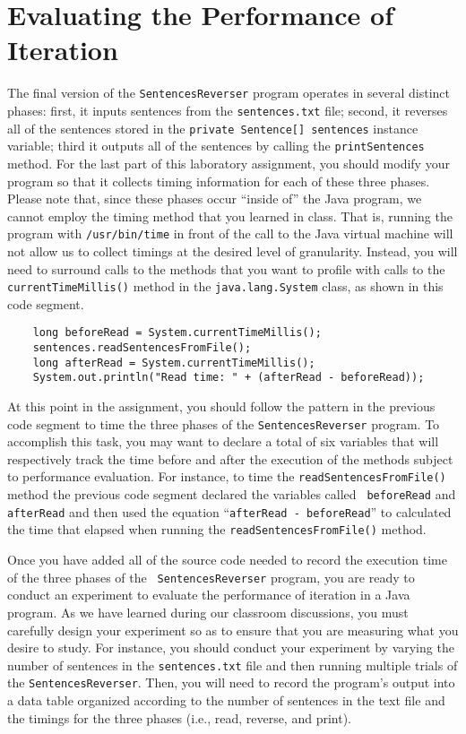 \section*{Evaluating the Performance of Iteration}

The final version of the {\tt SentencesReverser} program operates in several distinct phases: first, it inputs sentences
from the {\tt sentences.txt} file; second, it reverses all of the sentences stored in the {\tt private Sentence[]
sentences} instance variable; third it outputs all of the sentences by calling the {\tt printSentences} method. For the
last part of this laboratory assignment, you should modify your program so that it collects timing information for each
of these three phases. Please note that, since these phases occur ``inside of'' the Java program, we cannot employ the
timing method that you learned in class. That is, running the program with {\tt /usr/bin/time} in front of the call to
the Java virtual machine will not allow us to collect timings at the desired level of granularity. Instead, you will
need to surround calls to the methods that you want to profile with calls to the {\tt currentTimeMillis()} method in the
{\tt java.lang.System} class, as shown in this code segment.

\begin{verbatim}
    long beforeRead = System.currentTimeMillis();
    sentences.readSentencesFromFile();
    long afterRead = System.currentTimeMillis();
    System.out.println("Read time: " + (afterRead - beforeRead));
\end{verbatim}

At this point in the assignment, you should follow the pattern in the previous code segment to time the three phases of
the {\tt SentencesReverser} program. To accomplish this task, you may want to declare a total of six variables that will
respectively track the time before and after the execution of the methods subject to performance evaluation. For
instance, to time the {\tt readSentencesFromFile()} method the previous code segment declared the variables called {\tt
beforeRead} and {\tt afterRead} and then used the equation ``{\tt afterRead - beforeRead}'' to calculated the time that
elapsed when running the {\tt readSentencesFromFile()} method.

Once you have added all of the source code needed to record the execution time of the three phases of the {\tt
SentencesReverser} program, you are ready to conduct an experiment to evaluate the performance of iteration in a Java
program. As we have learned during our classroom discussions, you must carefully design your experiment so as to ensure
that you are measuring what you desire to study. For instance, you should conduct your experiment by varying the number
of sentences in the {\tt sentences.txt} file and then running multiple trials of the {\tt SentencesReverser}. Then, you
will need to record the program's output into a data table organized according to the number of sentences in the text
file and the timings for the three phases (i.e., read, reverse, and print).

